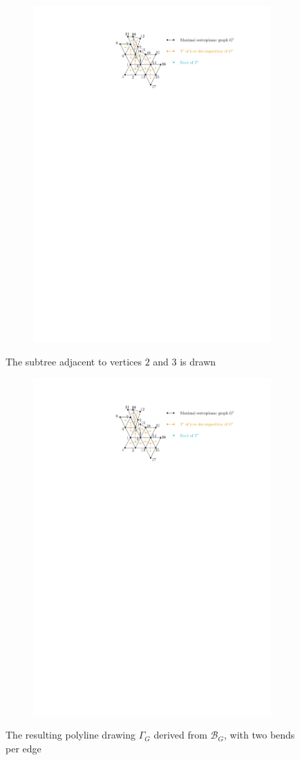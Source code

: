 \begin{figure}[H]
	\centering
	\begin{subfigure}{\textwidth}
		\centering
		\includegraphics[page=7,width=0.7\linewidth]{graphics/maximal_outerplanar_example_drawings.pdf}
	\end{subfigure}
	\caption{The subtree adjacent to vertices $2$ and $3$ is drawn}\label{im:example_drawing_box_G}
\end{figure}


\begin{figure}[H]
	\centering
	\begin{subfigure}{\textwidth}
		\centering
		\includegraphics[page=8,width=0.5\linewidth]{graphics/maximal_outerplanar_example_drawings.pdf}
	\end{subfigure}
	\caption{The resulting polyline drawing $\Gamma_{G}$ derived from $\mathcal{B}_{G}$, with two bends per edge}\label{im:example_drawing_gamma_G}
\end{figure}

